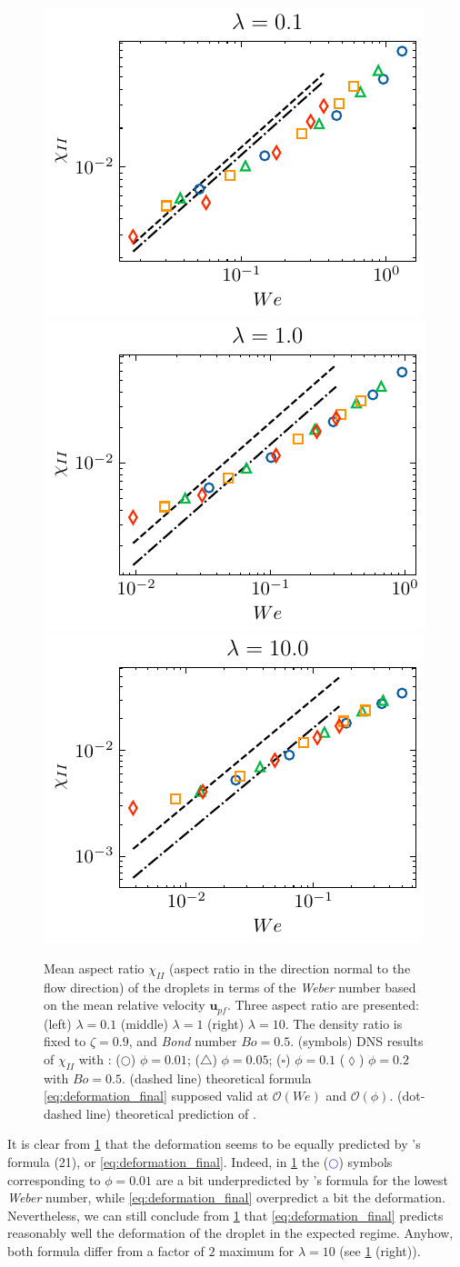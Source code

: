 \begin{figure}
    \centering
    \includegraphics[height = 0.25\textwidth]{image/HOMOGENEOUS_final/PA/chi2_l_1.pdf}
    \includegraphics[height = 0.25\textwidth]{image/HOMOGENEOUS_final/PA/chi2_l_10.pdf}
    \includegraphics[height = 0.25\textwidth]{image/HOMOGENEOUS_final/PA/chi2_l_100.pdf}
    \caption{
        Mean aspect ratio $\chi_{II}$ (aspect ratio in the direction normal to the flow direction) of the droplets in terms of the \textit{Weber} number based on the mean relative velocity $\textbf{u}_{pf}$. 
        Three aspect ratio are presented: (left) $\lambda = 0.1$ (middle) $\lambda = 1$ (right) $\lambda = 10$. 
        The density ratio is fixed to $\zeta = 0.9$, and \textit{Bond} number $Bo =0.5$. 
        (symbols) DNS results of $\chi_{II}$ with :
        ($\pmb\bigcirc$) $\phi = 0.01$; ($\pmb\triangle$) $ \phi = 0.05$; ($\pmb\square$) $\phi = 0.1$ ($\pmb\lozenge$) $\phi = 0.2$ with $Bo = 0.5$.
        (dashed line) theoretical formula \ref{eq:deformation_final} supposed valid at $\mathcal{O}(We)$ and $\mathcal{O}(\phi)$. 
        (dot-dashed line) theoretical prediction of \citet{taylor1964deformation}. 
     }
     \label{fig:compare_def_with_DNS}
\end{figure}
It is clear from \ref{fig:compare_def_with_DNS} that the deformation seems to be equally predicted by \citet{taylor1964deformation}'s formula (21), or \ref{eq:deformation_final}. 
Indeed, in \ref{fig:compare_def_with_DNS} the (\textcolor{blue}{$\pmb\bigcirc$}) symbols corresponding to $\phi = 0.01$ are a bit underpredicted by \citet{taylor1964deformation}'s formula for the lowest \textit{Weber} number, while \ref{eq:deformation_final} overpredict a bit the deformation. 
Nevertheless, we can still conclude from \ref{fig:compare_def_with_DNS} that \ref{eq:deformation_final} predicts reasonably well the deformation of the droplet in the expected regime.
Anyhow, both formula differ from a factor of $2$ maximum for $\lambda = 10$ (see \ref{fig:compare_def_with_DNS} (right)). 

